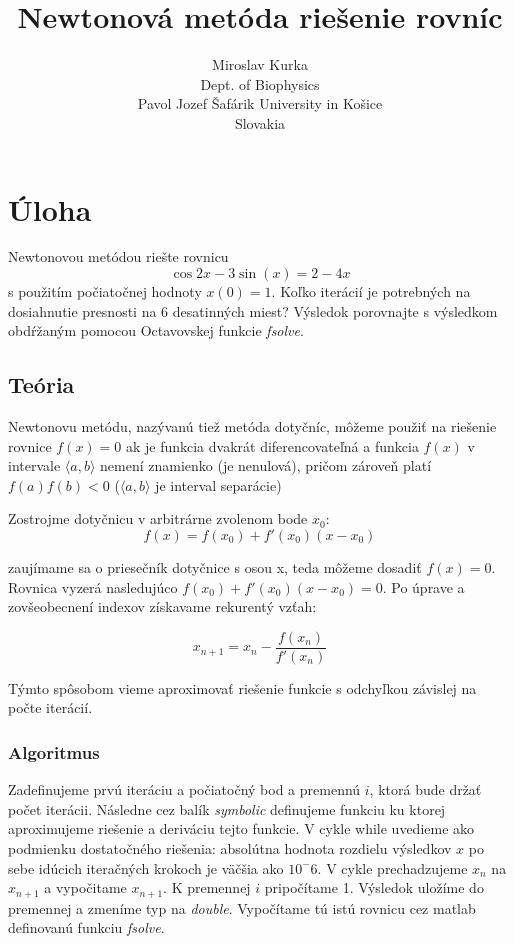 \documentclass{article}
\title{Newtonová metóda riešenie rovníc}
\author{Miroslav Kurka\\
  \small Dept. of Biophysics\\
  \small Pavol Jozef Šafárik University in Košice\\
  \small Slovakia 
}
\theoremstyle{definition}
\theoremstyle{remark}
\begin{document}
\maketitle


\section{Úloha}

Newtonovou metódou riešte rovnicu
$$\cos{2x}-3\sin(x)= 2-4x $$
s použitím počiatočnej hodnoty $x(0) = 1$. Koľko iterácií je potrebných na dosiahnutie
presnosti na 6 desatinných miest? Výsledok porovnajte s výsledkom obdŕžaným
pomocou Octavovskej funkcie \emph{fsolve}.

\subsection{Teória}\label{sec:nothing}
Newtonovu metódu, nazývanú tiež metóda dotyčníc, môžeme použiť na riešenie rovnice $f(x) = 0$ ak je funkcia dvakrát diferencovateľná a funkcia $f(x)$ v intervale $\langle a, b \rangle$  nemení znamienko (je nenulová), pričom zároveň platí $f(a)f(b) < 0$ ($\langle a, b \rangle$ je interval separácie)\cite{Bsp}

Zostrojme dotyčnicu v arbitrárne zvolenom bode $x_0$:
$$f(x)=f(x_0)+f'(x_0)(x-x_0)$$

zaujímame sa o priesečník dotyčnice s osou x, teda môžeme dosadiť $f(x)=0$. Rovnica vyzerá nasledujúco $f(x_0)+f'(x_0)(x-x_0)=0$. Po úprave a zovšeobecnení indexov získavame rekurentý vzťah:

$$x_{n+1}=x_n-\frac{f(x_n)}{f'(x_n)}$$

Týmto spôsobom vieme aproximovať riešenie funkcie s odchyľkou závislej na počte iterácií.

\subsubsection{Algoritmus}\label{sec:nothing2}
Zadefinujeme prvú iteráciu a počiatočný bod a premennú $i$, ktorá bude držať počet iterácii. Následne cez balík \emph{symbolic} definujeme funkciu ku ktorej aproximujeme riešenie a deriváciu tejto funkcie. V cykle while uvedieme ako podmienku dostatočného riešenia: absolútna hodnota rozdielu výsledkov $x$ po sebe idúcich iteračných krokoch je väčšia ako $10^-6$. V cykle prechadzujeme $x_n$ na $x_{n+1}$ a vypočitame $x_{n+1}$. K premennej $i$ pripočítame 1. Výsledok uložíme do premennej a zmeníme typ na \emph{double}. Vypočítame tú istú rovnicu cez matlab definovanú funkciu \emph{fsolve}. 
\end{document}
